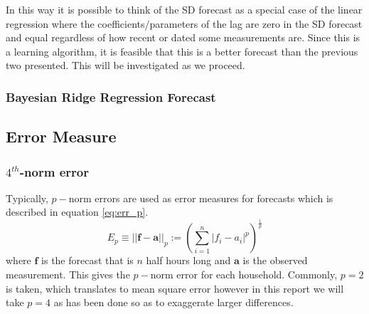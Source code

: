 \documentclass[a4paper]{article}
\begin{document}
In this way it is possible to think of the SD forecast as a special case of the linear regression where the coefficients/parameters of the lag are zero in the SD forecast and equal regardless of how recent or dated some measurements are. Since this is a learning algorithm, it is feasible that this is a better forecast than the previous two presented. This will be investigated as we proceed.

\subsubsection{Bayesian Ridge Regression Forecast} \label{subsubsec:BR}


\subsection{Error Measure}
\label{subsec:ErrMethods}

\subsubsection{$4^{th}$-norm error}
\label{subsubsec:4-norm} Typically, $p-$norm errors are used as error measures for forecasts which is described in equation \ref{eq:err_p}.
\begin{equation}\label{eq:err_p}
E_p \equiv ||\boldsymbol{f} - \boldsymbol{a}||_p := \left( \sum_{i=1}^{n} |f_i - a_i |^p\right)^{\frac{1}{p}}
\end{equation}
where $\boldsymbol{f}$ is the forecast that is $n$ half hours long and $\boldsymbol{a}$ is the observed measurement. This gives the $p-$norm error for each household. Commonly, $p=2$ is taken, which translates to mean square error however in this report we will take $p=4$ as has been done \citet{dan14}  so as to exaggerate larger differences.
\end{document}
